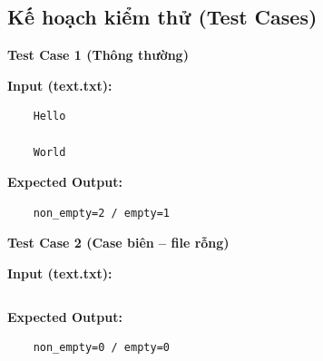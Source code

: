 \subsection{Kế hoạch kiểm thử (Test Cases)}

    \textbf{Test Case 1 (Thông thường)}

    \textbf{Input (text.txt):}
    \begin{lstlisting}
    Hello

    World\end{lstlisting}

    \textbf{Expected Output:}
    \begin{lstlisting}
    non_empty=2 / empty=1\end{lstlisting}

    \vspace{0.5cm}

    \textbf{Test Case 2 (Case biên -- file rỗng)}

    \textbf{Input (text.txt):}
    \begin{lstlisting}
    \end{lstlisting}

    \textbf{Expected Output:}
    \begin{lstlisting}
    non_empty=0 / empty=0\end{lstlisting}
